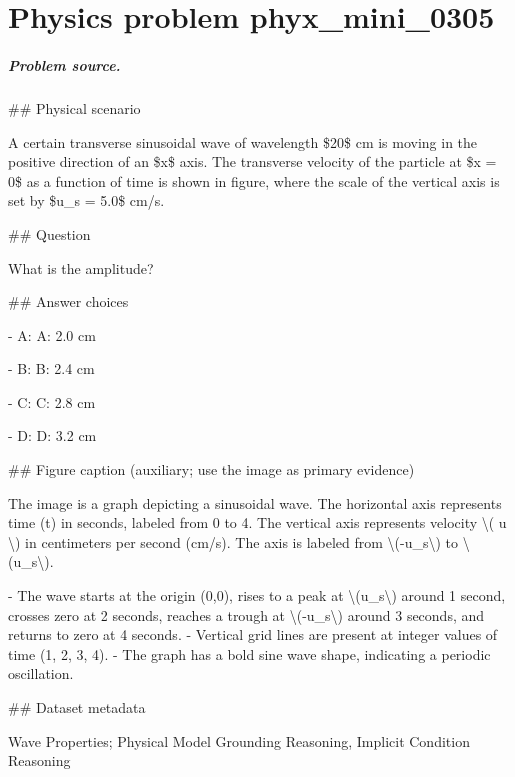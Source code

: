 
\chapter{Physics problem phyx\_mini\_0305}
\label{ch:PhyXMiniProblems_problem_phyx_mini_0305}

\paragraph{Problem source.}
\#\# Physical scenario

A certain transverse sinusoidal wave of wavelength \$20\$ cm is moving in the positive direction of an \$x\$ axis. The transverse velocity of the particle at \$x = 0\$ as a function of time is shown in figure, where the scale of the vertical axis is set by \$u\_s = 5.0\$ cm/s.

\#\# Question

What is the amplitude?

\#\# Answer choices

- A: A: 2.0 cm

- B: B: 2.4 cm

- C: C: 2.8 cm

- D: D: 3.2 cm

\#\# Figure caption (auxiliary; use the image as primary evidence)

The image is a graph depicting a sinusoidal wave. The horizontal axis represents time (t) in seconds, labeled from 0 to 4. The vertical axis represents velocity \textbackslash{}( u \textbackslash{}) in centimeters per second (cm/s). The axis is labeled from \textbackslash{}(-u\_s\textbackslash{}) to \textbackslash{}(u\_s\textbackslash{}).

- The wave starts at the origin (0,0), rises to a peak at \textbackslash{}(u\_s\textbackslash{}) around 1 second, crosses zero at 2 seconds, reaches a trough at \textbackslash{}(-u\_s\textbackslash{}) around 3 seconds, and returns to zero at 4 seconds.
- Vertical grid lines are present at integer values of time (1, 2, 3, 4).
- The graph has a bold sine wave shape, indicating a periodic oscillation.

\#\# Dataset metadata

Wave Properties; Physical Model Grounding Reasoning, Implicit Condition Reasoning

